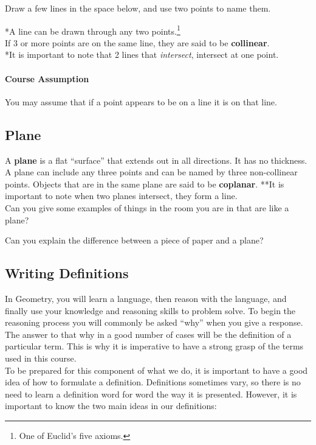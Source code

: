 \noindent \q Draw a few lines in the space below, and use two points to name them.
\bigskip

\noindent **A line can be drawn through any two points.\footnote{One of Euclid's five axioms.}\\  If 3 or more points are on the same line, they are said to be \textbf{collinear}.\\

\noindent **It is important to note that 2 lines that \emph{intersect}, intersect at one point.

\paragraph {Course Assumption}
You may assume that if a point appears to be on a line it is on that line.


\subsection{Plane}

A \textbf{plane} is a flat ``surface'' that extends out in all directions.  It has no thickness.  A plane can include any three points and can be named by three non-collinear points.  Objects that are in the same plane are said to be \textbf{coplanar}.  **It is important to note when two planes intersect, they form a line.\\
\noindent \q Can you give some examples of things in the room you are in that are like a plane?
\smallskip


\noindent \aq Can you explain the difference between a piece of paper and a plane?
\smallskip

\subsection{Writing Definitions}

In Geometry, you will learn a language, then reason with the language, and finally use your knowledge and reasoning skills to problem solve.  To begin the reasoning process you will commonly be asked ``why'' when you give a response.  The answer to that why in a good number of cases will be the definition of a particular term.  This is why it is imperative to have a strong grasp of the terms used in this course.\\

To be prepared for this component of what we do, it is important to have a good idea of how to formulate a definition.  Definitions sometimes vary, so there is no need to learn a definition word for word the way it is presented.  However, it is important to know the two main ideas in our definitions:

